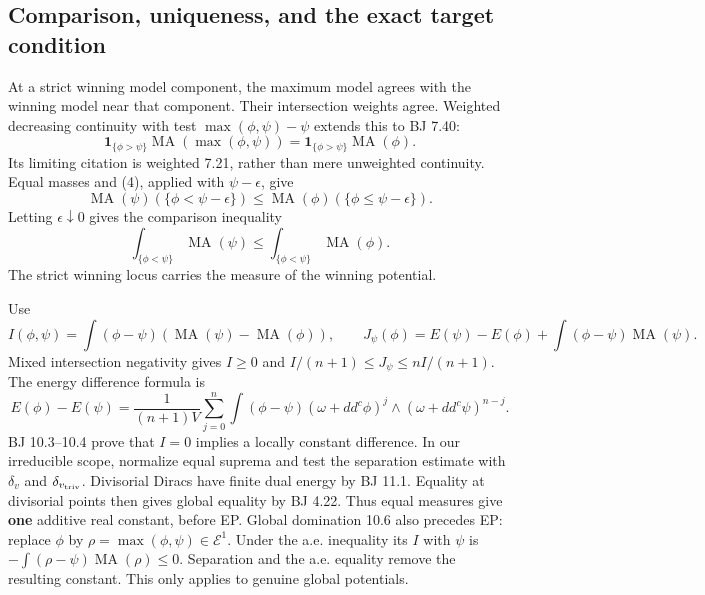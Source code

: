 \documentclass[
  11pt,
]{article}
\providecommand{\MA}{\operatorname{MA}}
\begin{document}
\subsection{Comparison, uniqueness, and the exact target
condition}\label{comparison-uniqueness-and-the-exact-target-condition}

At a strict winning model component, the maximum model agrees with the
winning model near that component. Their intersection weights agree.
Weighted decreasing continuity with test \(\max(\phi,\psi)-\psi\)
extends this to BJ 7.40: \[
 \mathbf1_{\{\phi>\psi\}}\MA(\max(\phi,\psi))
    =\mathbf1_{\{\phi>\psi\}}\MA(\phi).                                \tag{4}
\] Its limiting citation is weighted 7.21, rather than mere unweighted
continuity. Equal masses and (4), applied with \(\psi-\epsilon\), give
\[
 \MA(\psi)(\{\phi<\psi-\epsilon\})
    \le\MA(\phi)(\{\phi\le\psi-\epsilon\}).
\] Letting \(\epsilon\downarrow0\) gives the comparison inequality
\[\int_{\{\phi<\psi\}}\MA(\psi)\le\int_{\{\phi<\psi\}}\MA(\phi).       \tag{5}\]
The strict winning locus carries the measure of the winning potential.

Use \[I(\phi,\psi)=\int(\phi-\psi)(\MA(\psi)-\MA(\phi)),\qquad
 J_\psi(\phi)=E(\psi)-E(\phi)+\int(\phi-\psi)\MA(\psi).\] Mixed
intersection negativity gives \(I\ge0\) and
\(I/(n+1)\le J_\psi\le nI/(n+1)\). The energy difference formula is \[
 E(\phi)-E(\psi)=\frac1{(n+1)V}\sum_{j=0}^n
 \int(\phi-\psi)(\omega+dd^c\phi)^j\wedge(\omega+dd^c\psi)^{n-j}.       \tag{6}
\] BJ 10.3--10.4 prove that \(I=0\) implies a locally constant
difference. In our irreducible scope, normalize equal suprema and test
the separation estimate with \(\delta_v\) and \(\delta_{v_{\rm triv}}\).
Divisorial Diracs have finite dual energy by BJ 11.1. Equality at
divisorial points then gives global equality by BJ 4.22. Thus equal
measures give \textbf{one} additive real constant, before EP. Global
domination 10.6 also precedes EP: replace \(\phi\) by
\(\rho=\max(\phi,\psi)\in\mathcal E^1\). Under the a.e. inequality its
\(I\) with \(\psi\) is \(-\int(\rho-\psi)\MA(\rho)\le0\). Separation and
the a.e. equality remove the resulting constant. This only applies to
genuine global potentials.
\end{document}
